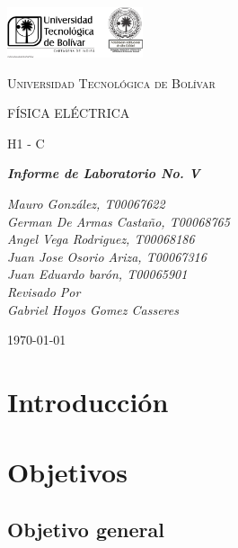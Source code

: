 \documentclass[twocolumn, 12pt]{article}
\begin{document}
\begin{titlepage}
	\centering
	\includegraphics[width=0.3\textwidth]{Images/logo_utb.png}\par\vspace{1cm}
	{\scshape\LARGE Universidad Tecnológica de Bolívar \par}
	\vspace{1cm}

	{\scshape\Large FÍSICA ELÉCTRICA \par}
	\vspace{.2cm}

	{\scshape\Large H1 - C \par}
	\vspace{1cm}
	\slshape {\Large \bfseries{}Informe de Laboratorio No. V\\}
	\vspace{1cm}

	\slshape {\itshape{} Mauro González, T00067622 \\}
	\slshape {\itshape{} German De Armas Castaño, T00068765 \\}
	\slshape {\itshape{} Angel Vega Rodriguez, T00068186 \\}
	\slshape {\itshape{} Juan Jose Osorio Ariza, T00067316 \\}
	\slshape {\itshape{} Juan Eduardo barón, T00065901 \\}
	\vfill
	Revisado Por \\
	Gabriel Hoyos Gomez Casseres\\
	{\large \today\par}
\end{titlepage}

\section{Introducción}


\section{Objetivos}

\subsection{Objetivo general}
\end{document}
